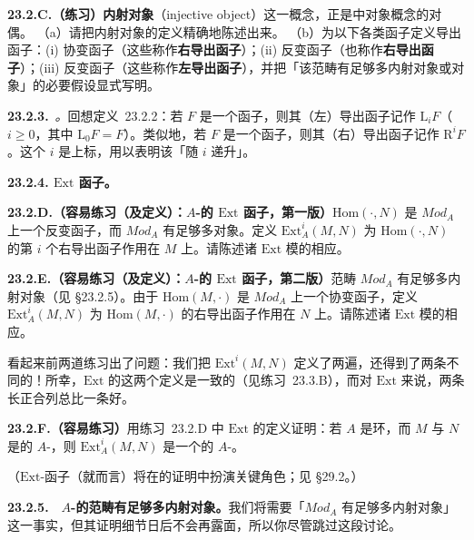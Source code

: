 \textbf{23.2.C.（练习）}\quad \textbf{内射对象}（injective object）这一概念，正是\trAbelianCategory{}中\trProjectiveObj{}对象概念的对偶。
（a）请把内射对象的定义精确地陈述出来。
（b）为以下各类函子定义导出函子：(i) 协变\trLeftExact{}函子（这些称作\textbf{右导出函子}）；(ii) 反变\trLeftExact{}函子（也称作\textbf{右导出函子}）；(iii) 反变\trRightExact{}函子（这些称作\textbf{左导出函子}），并把「该范畴有足够多内射对象或\trProjectiveObj{}对象」的必要假设显式写明。

\textbf{23.2.3.}\ \emph{\trhNotation。}\quad 回想\mbox{定义~23.2.2}：若 $F$ 是一个\trRightExact{}函子，则其（左）导出函子记作 $\mathrm{L}_iF$（$i\ge 0$，其中 $\mathrm{L}_0F=F$）。类似地，若 $F$ 是一个\trLeftExact{}函子，则其（右）导出函子记作 $\mathrm{R}^iF$。这个 $i$ 是上标，用以表明该\trLongExactSequence{}「随 $i$ 递升」。

\textbf{23.2.4. $\mathrm{Ext}$ 函子。}\quad

\textbf{23.2.D.（容易练习（及定义）：$A$-\trModule{}的 $\mathrm{Ext}$ 函子，第一版）}\quad $\mathrm{Hom}(\cdot,N)$ 是 $\mathit{Mod}_A$ 上一个反变\trLeftExact{}函子，而 $\mathit{Mod}_A$ 有足够多\trProjectiveObj{}对象。定义 $\mathrm{Ext}^i_A(M,N)$ 为 $\mathrm{Hom}(\cdot,N)$ 的第 $i$ 个右导出函子作用在 $M$ 上。请陈述诸 $\mathrm{Ext}$ 模的相应\trLongExactSequence。

\textbf{23.2.E.（容易练习（及定义）：$A$-\trModule{}的 $\mathrm{Ext}$ 函子，第二版）}\quad 范畴 $\mathit{Mod}_A$ 有足够多内射对象（见 \S23.2.5）。由于 $\mathrm{Hom}(M,\cdot)$ 是 $\mathit{Mod}_A$ 上一个协变\trLeftExact{}函子，定义 $\mathrm{Ext}^i_A(M,N)$ 为 $\mathrm{Hom}(M,\cdot)$ 的右导出函子作用在 $N$ 上。请陈述诸 $\mathrm{Ext}$ 模的相应\trLongExactSequence。

看起来前两道练习出了问题：我们把 $\mathrm{Ext}^i(M,N)$ 定义了两遍，还得到了两条不同的\trLongExactSequence！所幸，$\mathrm{Ext}$ 的这两个定义是一致的（见\mbox{练习~23.3.B}），而对 $\mathrm{Ext}$ 来说，两条长正合列总比一条好。

\textbf{23.2.F.（容易练习）}\quad 用\mbox{练习~23.2.D} 中 $\mathrm{Ext}$ 的定义证明：若 $A$ 是\trNoether 环，而 $M$ 与 $N$ 是\trFinitelyGenerated{}的 $A$-\trModule，则 $\mathrm{Ext}^i_A(M,N)$ 是一个\trFinitelyGenerated{}的 $A$-\trModule。

（$\mathrm{Ext}$-函子（就\trSheaf{}而言）将在\trSerreDuality{}的证明中扮演关键角色；见 \S29.2。）

\textbf{23.2.5.}\ \hard\ \textbf{$A$-\trModule{}的范畴有足够多内射对象。}\quad 我们将需要「$\mathit{Mod}_A$ 有足够多内射对象」这一事实，但其证明细节日后不会再露面，所以你尽管跳过这段讨论。

